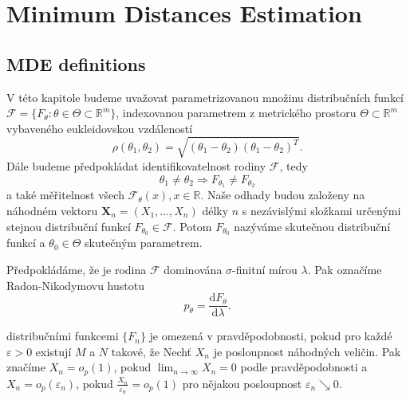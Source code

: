 
\chapter{Minimum Distances Estimation}
	\section{MDE definitions}
	
	
V této kapitole budeme uvažovat parametrizovanou množinu distribučních funkcí 
$\mathcal{F} = \lbrace F_\theta : \theta \in \Theta \subset \mathbb{R}^m 
\rbrace$, indexovanou parametrem z metrického prostoru $\Theta \subset 
\mathbb{R}^m$ vybaveného eukleidovskou vzdáleností 
\begin{equation}
	\rho (\theta_1,\theta_2) = \sqrt{(\theta_1-\theta_2)(\theta_1-\theta_2)^T}. 
\end{equation}
Dále budeme předpokládat identifikovatelnost rodiny $\mathcal{F}$, tedy 
\begin{equation}
\theta_1 \neq \theta_2 \Rightarrow F_{\theta_1} \neq F_{\theta_2}
\end{equation}
a také měřitelnost všech $\mathcal{F}_\theta(x), x \in \mathbb{R}$. Naše odhady 
budou založeny na náhodném vektoru $\mathbf{X}_n = (X_1, \ldots ,X_n)$ délky $n$ 
s nezávislými složkami určenými stejnou distribuční funkcí $F_{\theta_0} \in 
\mathcal{F}$. Potom $F_{\theta_0}$ nazýváme skutečnou distribuční funkcí a 
$\theta_0 \in \Theta$ skutečným parametrem. 

Předpokládáme, že je rodina $\mathcal{F}$ dominována $\sigma$-finitní mírou 
$\lambda$. Pak označíme Radon-Nikodymovu hustotu 
\begin{equation}
p_\theta = \dfrac{\mathrm{d} F_\theta}{\mathrm{d} \lambda}.
\end{equation}



\begin{definition}
distribučními funkcemi $\lbrace F_n \rbrace$ je omezená v pravděpodobnosti, 
pokud pro každé $\varepsilon > 0 $ existují $M$ a $N$ takové, že 
	Nech\v{t} $X_n$ je posloupnost náhodných veličin. Pak značíme $X_n = o_p(1)$, 
pokud $\lim_{n \rightarrow \infty } X_n = 0$ podle pravděpodobnosti a $X_n = 
o_p(\varepsilon_n)$, pokud $\frac{X_n}{\varepsilon_n} = o_p(1)$ pro nějakou 
posloupnost $\varepsilon_n \searrow 0$.
\end{definition} 


